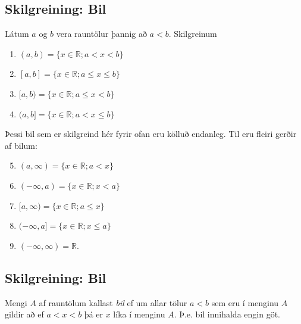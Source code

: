 \documentclass[a4paper,10pt,icelandic]{sphinxmanual}
\begin{document}
\subsection{Skilgreining: Bil}
\label{\detokenize{kafli01:skilgreining-bil}}\label{\detokenize{kafli01:index-2}}
Látum \(a\) og \(b\) vera rauntölur þannig að
\(a<b\). Skilgreinum
\begin{enumerate}
\item {} 
 \((a,b)=\{x\in \mathbb{R}; a<x<b\}\)

\item {} 
 \([a,b]=\{x\in \mathbb{R}; a\leq x\leq b\}\)

\item {} 
 \([a,b)=\{x\in \mathbb{R}; a\leq x<b\}\)

\item {} 
 \((a,b]=\{x\in \mathbb{R}; a< x\leq b\}\)

\end{enumerate}

Þessi bil sem er skilgreind hér fyrir ofan eru kölluð endanleg. Til eru
fleiri gerðir af bilum:
\begin{enumerate}
\setcounter{enumi}{4}
\item {} 
 \((a,\infty)=\{x\in \mathbb{R}; a<x\}\)

\item {} 
 \((-\infty, a)=\{x\in \mathbb{R}; x<a\}\)

\item {} 
 \([a,\infty)=\{x\in \mathbb{R}; a\leq x\}\)

\item {} 
 \((-\infty, a]=\{x\in \mathbb{R}; x\leq a\}\)

\item {} 
 \((-\infty, \infty)= \mathbb{R}\).

\end{enumerate}


\subsection{Skilgreining: Bil}
\label{\detokenize{kafli01:id1}}
Mengi \(A\) af rauntölum kallast \textit{bil} ef um allar
tölur \(a<b\) sem eru í menginu \(A\) gildir að ef \(a<x<b\)
þá er \(x\) líka í menginu \(A\). Þ.e. bil innihalda engin göt.
\end{document}
